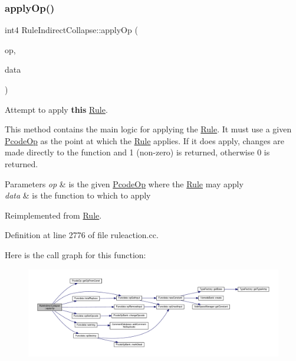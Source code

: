 \subsubsection{\texorpdfstring{applyOp()}{applyOp()}}
{\footnotesize\ttfamily int4 Rule\+Indirect\+Collapse\+::apply\+Op (\begin{DoxyParamCaption}\item[{\mbox{\hyperlink{class_pcode_op}{Pcode\+Op}} $\ast$}]{op,  }\item[{\mbox{\hyperlink{class_funcdata}{Funcdata}} \&}]{data }\end{DoxyParamCaption})\hspace{0.3cm}{\ttfamily [virtual]}}



Attempt to apply {\bfseries{this}} \mbox{\hyperlink{class_rule}{Rule}}. 

This method contains the main logic for applying the \mbox{\hyperlink{class_rule}{Rule}}. It must use a given \mbox{\hyperlink{class_pcode_op}{Pcode\+Op}} as the point at which the \mbox{\hyperlink{class_rule}{Rule}} applies. If it does apply, changes are made directly to the function and 1 (non-\/zero) is returned, otherwise 0 is returned. 
\begin{DoxyParams}{Parameters}
{\em op} & is the given \mbox{\hyperlink{class_pcode_op}{Pcode\+Op}} where the \mbox{\hyperlink{class_rule}{Rule}} may apply \\
\hline
{\em data} & is the function to which to apply \\
\hline
\end{DoxyParams}


Reimplemented from \mbox{\hyperlink{class_rule_a4e3e61f066670175009f60fb9dc60848}{Rule}}.



Definition at line 2776 of file ruleaction.\+cc.

Here is the call graph for this function\+:
\nopagebreak
\begin{figure}[H]
\begin{center}
\leavevmode
\includegraphics[width=350pt]{class_rule_indirect_collapse_a0d4041209c44deabc2baa829c022d642_cgraph}
\end{center}
\end{figure}
\mbox{\label{class_rule_indirect_collapse_aef29a6d2a3b44941b7c8b98eafef59aa}} 
